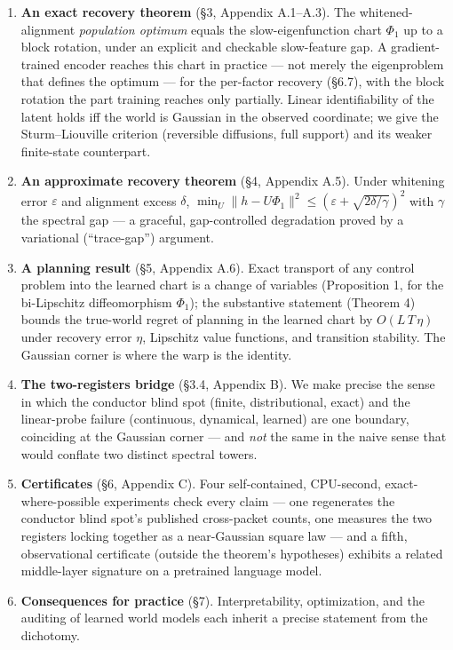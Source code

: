 \documentclass[
  letterpaper,
  11pt]{article}
\theoremstyle{plain}
\theoremstyle{definition}
\theoremstyle{remark}
\begin{document}
\begin{enumerate}
\def\labelenumi{\arabic{enumi}.}
\item
  \textbf{An exact recovery theorem} (§3, Appendix A.1--A.3). The whitened-alignment \emph{population optimum} equals the slow-eigenfunction chart \(\Phi_1\) up to a block rotation, under an explicit and checkable slow-feature gap. A gradient-trained encoder reaches this chart in practice --- not merely the eigenproblem that defines the optimum --- for the per-factor recovery (§6.7), with the block rotation the part training reaches only partially. Linear identifiability of the latent holds iff the world is Gaussian in the observed coordinate; we give the Sturm--Liouville criterion (reversible diffusions, full support) and its weaker finite-state counterpart.
\item
  \textbf{An approximate recovery theorem} (§4, Appendix A.5). Under whitening error \(\varepsilon\) and alignment excess \(\delta\), \(\min_{U}\|h-U\Phi_1\|^2 \le (\varepsilon+\sqrt{2\delta/\gamma})^2\) with \(\gamma\) the spectral gap --- a graceful, gap-controlled degradation proved by a variational (``trace-gap'') argument.
\item
  \textbf{A planning result} (§5, Appendix A.6). Exact transport of any control problem into the learned chart is a change of variables (Proposition 1, for the bi-Lipschitz diffeomorphism \(\Phi_1\)); the substantive statement (Theorem 4) bounds the true-world regret of planning in the learned chart by \(O(L\,T\,\eta)\) under recovery error \(\eta\), Lipschitz value functions, and transition stability. The Gaussian corner is where the warp is the identity.
\item
  \textbf{The two-registers bridge} (§3.4, Appendix B). We make precise the sense in which the conductor blind spot (finite, distributional, exact) and the linear-probe failure (continuous, dynamical, learned) are one boundary, coinciding at the Gaussian corner --- and \emph{not} the same in the naive sense that would conflate two distinct spectral towers.
\item
  \textbf{Certificates} (§6, Appendix C). Four self-contained, CPU-second, exact-where-possible experiments check every claim --- one regenerates the conductor blind spot's published cross-packet counts, one measures the two registers locking together as a near-Gaussian square law --- and a fifth, observational certificate (outside the theorem's hypotheses) exhibits a related middle-layer signature on a pretrained language model.
\item
  \textbf{Consequences for practice} (§7). Interpretability, optimization, and the auditing of learned world models each inherit a precise statement from the dichotomy.
\end{enumerate}
\end{document}

